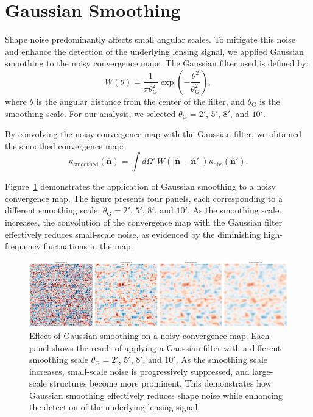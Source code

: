 \section{Gaussian Smoothing}
Shape noise predominantly affects small angular scales. To mitigate this noise and enhance the detection of the underlying lensing signal, we applied Gaussian smoothing to the noisy convergence maps. The Gaussian filter used is defined by:
\begin{equation}
    W(\theta) = \frac{1}{\pi \theta_{\mathrm{G}}^2} \exp\left( -\frac{\theta^2}{\theta_{\mathrm{G}}^2} \right),
\end{equation}
where $\theta$ is the angular distance from the center of the filter, and $\theta_{\mathrm{G}}$ is the smoothing scale. For our analysis, we selected $\theta_{\mathrm{G}} = 2'$, $5'$, $8'$, and $10'$.

By convolving the noisy convergence map with the Gaussian filter, we obtained the smoothed convergence map:
\begin{equation}
    \kappa_{\mathrm{smoothed}}(\hat{\mathbf{n}}) = \int d\Omega' \, W(|\hat{\mathbf{n}} - \hat{\mathbf{n}}'|) \kappa_{\mathrm{obs}}(\hat{\mathbf{n}}').
\end{equation}

Figure~\ref{fig:smoothing} demonstrates the application of Gaussian smoothing to a noisy convergence map. The figure presents four panels, each corresponding to a different smoothing scale: $\theta_{\mathrm{G}} = 2'$, $5'$, $8'$, and $10'$. As the smoothing scale increases, the convolution of the convergence map with the Gaussian filter effectively reduces small-scale noise, as evidenced by the diminishing high-frequency fluctuations in the map. 
\begin{figure}[ht]
    \centering
    \includegraphics[width=\textwidth]{figures/smoothed_comparison.png}
    \caption{Effect of Gaussian smoothing on a noisy convergence map. Each panel shows the result of applying a Gaussian filter with a different smoothing scale $\theta_{\mathrm{G}} = 2'$, $5'$, $8'$, and $10'$. As the smoothing scale increases, small-scale noise is progressively suppressed, and large-scale structures become more prominent. This demonstrates how Gaussian smoothing effectively reduces shape noise while enhancing the detection of the underlying lensing signal.}
\label{fig:smoothing}
\end{figure}

